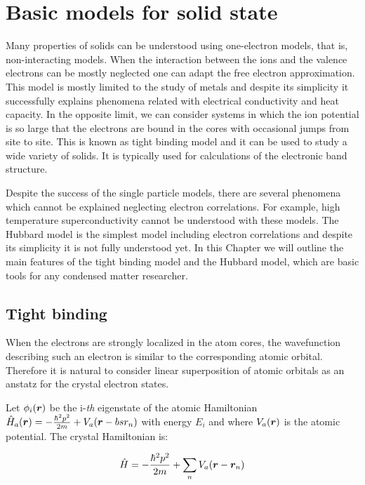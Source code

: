 \chapter{Basic models for solid state}

Many properties of solids can be understood using one-electron models, that is, non-interacting models. When the interaction between the ions and the valence electrons can be mostly neglected one can adapt the free electron approximation. This model is mostly limited to the study of metals and despite its simplicity it successfully explains phenomena related with electrical conductivity and heat capacity. In the opposite limit, we can consider systems in which the ion potential is so large that the electrons are bound in the cores with occasional jumps from site to site. This is known as tight binding model and it can be used to study a wide variety of solids. It is typically used for calculations of the electronic band structure.

Despite the success of the single particle models, there are several phenomena which cannot be explained neglecting electron correlations. For example, high temperature superconductivity cannot be understood with these models. The Hubbard model is the simplest model including electron correlations and despite its simplicity it is not fully understood yet. In this Chapter we will outline the main features of the tight binding model and the Hubbard model, which are basic tools for any condensed matter researcher.

\section{Tight binding}

When the electrons are strongly localized in the atom cores, the wavefunction describing such an electron is similar to the corresponding atomic orbital. Therefore it is natural to consider linear superposition of atomic orbitals as an anstatz for the crystal electron states.

Let $\phi_i(\boldsymbol{r})$ be the i-\textit{th} eigenstate of the atomic Hamiltonian $\hat{H}_a(\boldsymbol{r}) = -\frac{\hbar^2p^2}{2m} + V_a(\boldsymbol{r}-bs{r}_n)$ with energy $E_i$ and where $V_a(\boldsymbol{r})$ is the atomic potential. The crystal Hamiltonian is:

\begin{equation}
\label{CrystalHam}
\hat{H} = -\frac{\hbar^2p^2}{2m} + \sum_n V_a(\boldsymbol{r}-\boldsymbol{r}_n)
\end{equation}


